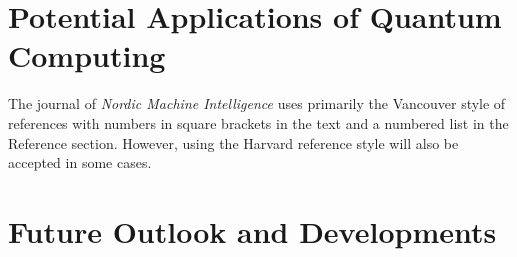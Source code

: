 \documentclass{elbioimp2}
\begin{document}
\section{Potential Applications of Quantum Computing}
The journal of \emph{Nordic Machine Intelligence} uses primarily the Vancouver
style of references with numbers in square brackets in the text and a
numbered list in the Reference section.\cite{biomed-req} However, using the
Harvard reference style will also be accepted in some cases.

\section{Future Outlook and Developments}


\newpage
\nocite{*}
\printbibliography
\end{document}
